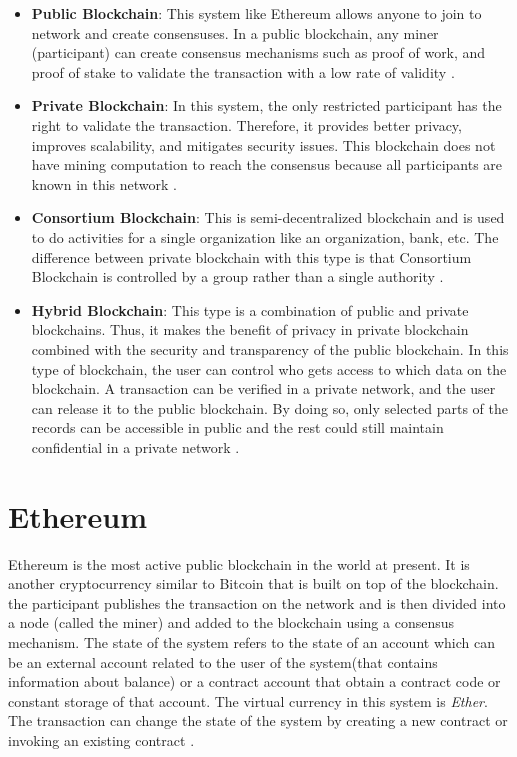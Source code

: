 \begin{itemize}
    \item \textbf{Public Blockchain}:
    This system like Ethereum allows anyone to join to network and create consensuses. In a public blockchain, any miner (participant) can create consensus mechanisms such as proof of work, and proof of stake to validate the transaction with a low rate of validity \cite{Kalra}.
    \item \textbf{Private Blockchain}: In this system, the only restricted participant has the right to validate the transaction. Therefore, it provides better privacy, improves scalability, and mitigates security issues. This blockchain does not have mining computation to reach the consensus because all participants are known in this network \cite{Kalra}. 
    \item \textbf{Consortium Blockchain}: This is semi-decentralized blockchain and is used to do activities for a single organization like an organization, bank, etc. The difference between private blockchain with this type is that Consortium Blockchain is controlled by a group rather than a single authority \cite{Aithal}.
    \item \textbf{Hybrid Blockchain}: This type is a combination of public and private blockchains. Thus, it makes the benefit of privacy in private blockchain combined with the security and transparency of the public blockchain. In this type of blockchain, the user can control who gets access to which data on the blockchain. A transaction can be verified in a private network, and the user can release it to the public blockchain. By doing so, only selected parts of the records can be accessible in public and the rest could still maintain confidential in a private network \cite{Aithal}. 
\end{itemize}

 \section{Ethereum}
 Ethereum is the most active public blockchain in the world at present. It is another cryptocurrency similar to Bitcoin that is built on top of the blockchain. the participant publishes the transaction on the network and is then divided into a node (called the miner) and added to the blockchain using a consensus mechanism. The state of the system refers to the state of an account which can be an external account related to the user of the system(that contains information about balance) or a contract account that obtain a contract code or constant storage of that account. The virtual currency in this system is \textit{Ether}. The transaction can change the state of the system by creating a new contract or invoking an existing contract \cite{Ilya}.

